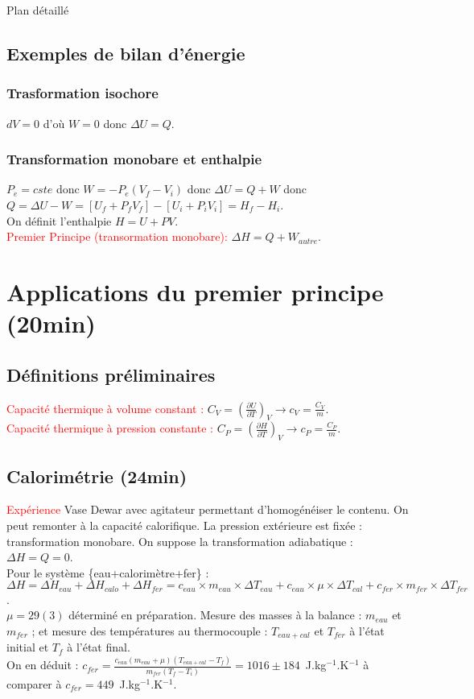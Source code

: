 \begin{reportBlock}{Plan détaillé}
 \subsection{Exemples de bilan d'énergie}
 \subsubsection{Trasformation isochore}
 $dV=0$ d'où $W=0$ donc $\Delta U = Q$.
 
 \subsubsection{Transformation monobare et enthalpie}
 $P_e=cste$ donc $W=-P_e(V_f-V_i)$ donc $\Delta U = Q + W$ donc $Q = \Delta U - W = [U_f +P_f V_f]-[U_i+P_iV_i] = H_f - H_i$.\\
 On définit l'enthalpie $H=U+PV$.\\
 
 \textcolor{red}{Premier Principe (transormation monobare):} $\Delta H = Q + W_{autre}$.
 
  \section{Applications du premier principe (20min)}
  \subsection{Définitions préliminaires}
  \textcolor{red}{Capacité thermique à volume constant : } $C_V = (\frac{\partial{U}}{\partial{T}})_V \rightarrow c_V = \frac{C_V}{m}$. \\
  \textcolor{red}{Capacité thermique à pression constante : } $C_P = (\frac{\partial{H}}{\partial{T}})_V \rightarrow c_P = \frac{C_P}{m}$. \\
  
  \subsection{Calorimétrie (24min)}
  \textcolor{red}{Expérience} Vase Dewar avec agitateur permettant d'homogénéiser le contenu. On peut remonter à la capacité calorifique.  La pression extérieure est fixée : transformation monobare. On suppose la transformation adiabatique : $\Delta H = Q = 0$.\\
  Pour le système \{eau+calorimètre+fer\} : $\Delta H = \Delta H_{eau} + \Delta H_{calo} + \Delta H_{fer} = c_{eau}\times m_{eau}\times \Delta T_{eau} + c_{eau}\times \mu \times \Delta T_{cal} + c_{fer}\times m_{fer}\times \Delta T_{fer}$.\\
  $\mu =29(3)$ déterminé en préparation. Mesure des masses à la balance : $m_{eau}$ et $m_{fer}$ ; et mesure des températures au thermocouple : $T_{eau+cal}$ et $T_{fer}$ à l'état initial et  $T_f$ à l'état final.\\
  On en déduit : $c_{fer}=\frac{c_{eau}(m_{eau}+\mu)(T_{eau+cal}-T_f)}{m_{fer}(T_f-T_i)}=1016\pm 184$~J.kg$^{-1}$.K$^{-1}$ à comparer à $c_{fer}=449$~J.kg$^{-1}$.K$^{-1}$.\\
  

\end{reportBlock}

